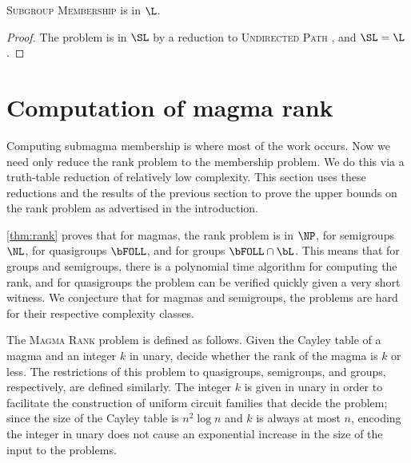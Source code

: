 \documentclass{article}
\begin{document}
\begin{lemma}\label{lem:subgroupmem}
  \textsc{Subgroup Membership} is in $\L$.
\end{lemma}
\begin{proof}
  The problem is in $\SL$ by a reduction to \textsc{Undirected Path} \autocite[Section~3]{bm89}, and $\SL = \L$ \cite{reingold08}.
\end{proof}

\section{Computation of magma rank}

%
Computing submagma membership is where most of the work occurs.
Now we need only reduce the rank problem to the membership problem.
We do this via a truth-table reduction of relatively low complexity.
This section uses these reductions and the results of the previous section to prove the upper bounds on the rank problem as advertised in the introduction.

%
\autoref{thm:rank} proves that for magmas, the rank problem is in $\NP$, for semigroups $\NL$, for quasigroups $\bFOLL$, and for groups $\bFOLL \cap \bL$.
This means that for groups and semigroups, there is a polynomial time algorithm for computing the rank, and for quasigroups the problem can be verified quickly given a very short witness.
We conjecture that for magmas and semigroups, the problems are hard for their respective complexity classes.

The \textsc{Magma Rank} problem is defined as follows.
Given the Cayley table of a magma and an integer $k$ in unary, decide whether the rank of the magma is $k$ or less.
The restrictions of this problem to quasigroups, semigroups, and groups, respectively, are defined similarly.
The integer $k$ is given in unary in order to facilitate the construction of uniform circuit families that decide the problem; since the size of the Cayley table is $n^2 \log n$ and $k$ is always at most $n$, encoding the integer in unary does not cause an exponential increase in the size of the input to the problems.
\end{document}
